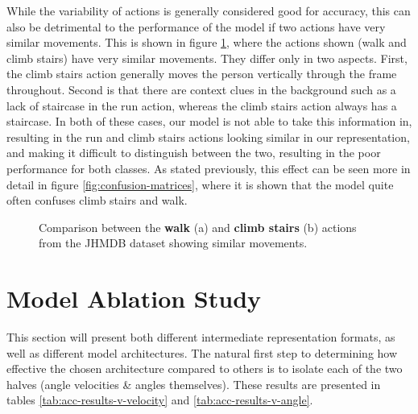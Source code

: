 While the variability of actions is generally considered good for accuracy, this can also be detrimental to the performance of the model if two actions have very similar movements. This is shown in figure \ref{fig:walk-climb-actions}, where the actions shown (walk and climb stairs) have very similar movements. They differ only in two aspects. First, the climb stairs action generally moves the person vertically through the frame throughout. Second is that there are context clues in the background such as a lack of staircase in the run action, whereas the climb stairs action always has a staircase. In both of these cases, our model is not able to take this information in, resulting in the run and climb stairs actions looking similar in our representation, and making it difficult to distinguish between the two, resulting in the poor performance for both classes. As stated previously, this effect can be seen more in detail in figure \ref{fig:confusion-matrices}, where it is shown that the model quite often confuses climb stairs and walk.

\begin{figure}[ht]
	\centering
	\caption{Comparison between the \textbf{walk} (a) and \textbf{climb stairs} (b) actions from the JHMDB dataset \cite{JHMDB} showing similar movements.}
	\label{fig:walk-climb-actions}
\end{figure}

\section{Model Ablation Study}

This section will present both different intermediate representation formats, as well as different model architectures. The natural first step to determining how effective the chosen architecture compared to others is to isolate each of the two halves (angle velocities \& angles themselves). These results are presented in tables \ref{tab:acc-results-v-velocity} and \ref{tab:acc-results-v-angle}.

